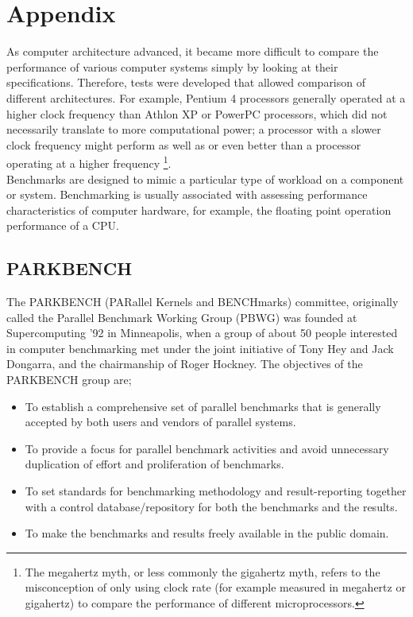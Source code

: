 
\section*{Appendix} %

As computer architecture advanced, it became more difficult to compare the performance of various computer systems simply by looking at their specifications. Therefore, tests were developed that allowed comparison of different architectures. For example, Pentium 4 processors generally operated at a higher clock frequency than Athlon XP or PowerPC processors, which did not necessarily translate to more computational power; a processor with a slower clock frequency might perform as well as or even better than a processor operating at a higher frequency \footnote{The megahertz myth, or less commonly the gigahertz myth, refers to the misconception of only using clock rate (for example measured in megahertz or gigahertz) to compare the performance of different microprocessors.}.
\\
Benchmarks are designed to mimic a particular type of workload on a component or system. Benchmarking is usually associated with assessing performance characteristics of computer hardware, for example, the floating point operation performance of a CPU.
\subsection*{PARKBENCH}
The PARKBENCH (PARallel Kernels and BENCHmarks) committee, originally called the Parallel Benchmark Working Group (PBWG) was founded at Supercomputing '92 in Minneapolis, when a group of about 50 people interested in computer benchmarking met under the joint initiative of Tony Hey and Jack Dongarra, and the chairmanship of Roger Hockney. The objectives of the PARKBENCH group are; 
\begin{itemize} 
\item To establish a comprehensive set of parallel benchmarks that is generally accepted by both users and vendors of parallel systems.

\item To provide a focus for parallel benchmark activities and avoid unnecessary duplication of effort and proliferation of benchmarks.
\item To set standards for benchmarking methodology and result-reporting together with a control database/repository for both the benchmarks and the results.
\item To make the benchmarks and results freely available in the public domain. 
\end{itemize}
	
